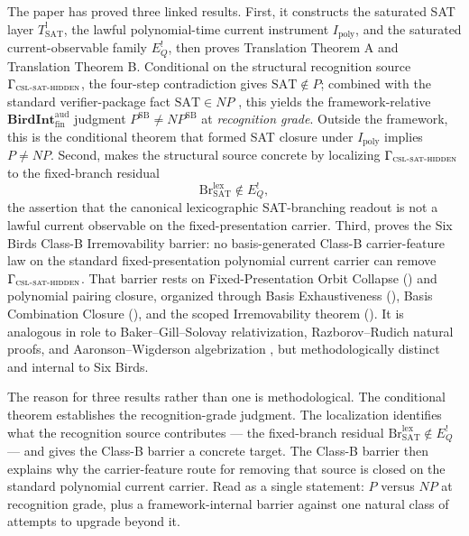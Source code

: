 \documentclass[11pt]{article}
\newcommand{\Tsat}{T^{!}_{\mathrm{SAT}}}
\newcommand{\Ipoly}{I_{\mathrm{poly}}}
\newcommand{\EQbang}{E^{!}_{Q}}
\newcommand{\CSLSATHidden}{\Gamma_{\textsc{csl-sat-hidden}}}
\newcommand{\PSB}{P^{\mathrm{SB}}}
\newcommand{\NPSB}{NP^{\mathrm{SB}}}
\newcommand{\BirdInt}{\mathbf{BirdInt}^{\mathrm{aud}}_{\mathrm{fin}}}
\newcommand{\RecognitionGrade}{\emph{recognition grade}}
\theoremstyle{definition}
\begin{document}
The paper has proved three linked results.  First, it constructs the
saturated SAT layer \(\Tsat\), the lawful polynomial-time current
instrument \(\Ipoly\), and the saturated current-observable family
\(\EQbang\), then proves Translation Theorem A and Translation Theorem
B.  Conditional on the structural recognition source
\(\CSLSATHidden\), the four-step contradiction gives
\(\mathrm{SAT}\notin P\); combined with the standard verifier-package
fact \(\mathrm{SAT}\in NP\) \citep{Cook1971TheoremProving}, this yields
the framework-relative \(\BirdInt\) judgment \(\PSB\neq\NPSB\) at
\RecognitionGrade{}.  Outside the framework, this is the conditional
theorem that formed SAT closure under \(\Ipoly\) implies \(P\neq NP\).
Second,  makes the structural source
concrete by localizing \(\CSLSATHidden\) to the fixed-branch residual
\[
  \mathrm{Br}^{\mathrm{lex}}_{\mathrm{SAT}}\notin\EQbang,
\]
the assertion that the canonical lexicographic SAT-branching readout is
not a lawful current observable on the fixed-presentation carrier.
Third,  proves the Six Birds Class-B
Irremovability barrier: no basis-generated Class-B carrier-feature law
on the standard fixed-presentation polynomial current carrier can
remove \(\CSLSATHidden\).  That barrier rests on Fixed-Presentation
Orbit Collapse () and polynomial
pairing closure, organized through Basis Exhaustiveness
(), Basis Combination Closure
(), and the scoped
Irremovability theorem ().  It
is analogous in role to Baker--Gill--Solovay relativization,
Razborov--Rudich natural proofs, and Aaronson--Wigderson algebrization
\citep{BakerGillSolovay1975Relativization,RazborovRudich1997NaturalProofs,AaronsonWigderson2009Algebrization},
but methodologically distinct and internal to Six Birds.

The reason for three results rather than one is methodological.  The
conditional theorem establishes the recognition-grade judgment.  The
localization identifies what the recognition source contributes — the
fixed-branch residual
\(\mathrm{Br}^{\mathrm{lex}}_{\mathrm{SAT}}\notin\EQbang\) — and gives
the Class-B barrier a concrete target.  The Class-B barrier then
explains why the carrier-feature route for removing that source is
closed on the standard polynomial current carrier.  Read as a single
statement: \(P\) versus \(NP\) at recognition grade, plus a
framework-internal barrier against one natural class of attempts to
upgrade beyond it.
\end{document}
